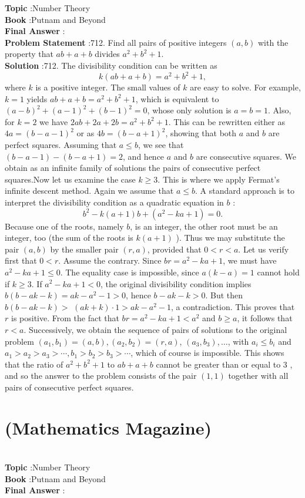 \documentclass[10pt]{article}
\begin{document}
\textbf{Topic} :Number Theory\\
\textbf{Book} :Putnam and Beyond\\
\textbf{Final Answer} :\\


\textbf{Problem Statement} :712. Find all pairs of positive integers $(a, b)$ with the property that $a b+a+b$ divides $a^{2}+b^{2}+1$.\\
\textbf{Solution} :712. The divisibility condition can be written as$$ k(a b+a+b)=a^{2}+b^{2}+1, $$where $k$ is a positive integer. The small values of $k$ are easy to solve. For example, $k=1$ yields $a b+a+b=a^{2}+b^{2}+1$, which is equivalent to $(a-b)^{2}+(a-1)^{2}+(b-1)^{2}=0$, whose only solution is $a=b=1$. Also, for $k=2$ we have $2 a b+2 a+2 b=a^{2}+b^{2}+1$. This can be rewritten either as $4 a=(b-a-1)^{2}$ or as $4 b=(b-a+1)^{2}$, showing that both $a$ and $b$ are perfect squares. Assuming that $a \leq b$, we see that $(b-a-1)-(b-a+1)=2$, and hence $a$ and $b$ are consecutive squares. We obtain as an infinite family of solutions the pairs of consecutive perfect squares.Now let us examine the case $k \geq 3$. This is where we apply Fermat's infinite descent method. Again we assume that $a \leq b$. A standard approach is to interpret the divisibility condition as a quadratic equation in $b$ :$$ b^{2}-k(a+1) b+\left(a^{2}-k a+1\right)=0 . $$Because one of the roots, namely $b$, is an integer, the other root must be an integer, too (the sum of the roots is $k(a+1)$ ). Thus we may substitute the pair $(a, b)$ by the smaller pair $(r, a)$, provided that $0<r<a$. Let us verify first that $0<r$. Assume the contrary. Since $b r=a^{2}-k a+1$, we must have $a^{2}-k a+1 \leq 0$. The equality case is impossible, since $a(k-a)=1$ cannot hold if $k \geq 3$. If $a^{2}-k a+1<0$, the original divisibility condition implies $b(b-a k-k)=a k-a^{2}-1>0$, hence $b-a k-k>0$. But then $b(b-a k-k)>$ $(a k+k) \cdot 1>a k-a^{2}-1$, a contradiction. This proves that $r$ is positive. From the fact that $b r=a^{2}-k a+1<a^{2}$ and $b \geq a$, it follows that $r<a$. Successively, we obtain the sequence of pairs of solutions to the original problem $\left(a_{1}, b_{1}\right)=(a, b),\left(a_{2}, b_{2}\right)=(r, a)$, $\left(a_{3}, b_{3}\right), \ldots$, with $a_{i} \leq b_{i}$ and $a_{1}>a_{2}>a_{3}>\cdots, b_{1}>b_{2}>b_{3}>\cdots$, which of course is impossible. This shows that the ratio of $a^{2}+b^{2}+1$ to $a b+a+b$ cannot be greater than or equal to 3 , and so the answer to the problem consists of the pair $(1,1)$ together with all pairs of consecutive perfect squares.\section{(Mathematics Magazine)}\\
\textbf{Topic} :Number Theory\\
\textbf{Book} :Putnam and Beyond\\
\textbf{Final Answer} :\\
\end{document}
